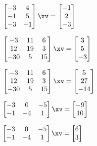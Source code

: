 \begin{exercise}
\begin{Parts}
\item \(\begin{bmatrix} -3&4
\\-1&5
\\-3&-1 \end{bmatrix}\xv
=\begin{bmatrix} -1\\2\\-3 \end{bmatrix}\)

\begin{OmitV1}
\item \(\begin{bmatrix} -3&11&6
\\12&19&3
\\-30&5&15 \end{bmatrix}\xv
=\begin{bmatrix} 3\\5\\-3 \end{bmatrix}\)

\item \(\begin{bmatrix} -3&11&6
\\12&19&3
\\-30&5&15 \end{bmatrix}\xv
=\begin{bmatrix} 5\\27\\-14 \end{bmatrix}\)

\item \(\begin{bmatrix} -3&0&-5
\\-1&-4&1 \end{bmatrix}\xv
=\begin{bmatrix} -9\\10 \end{bmatrix}\)

\item \(\begin{bmatrix} -3&0&-5
\\-1&-4&1 \end{bmatrix}\xv
=\begin{bmatrix} 6\\3 \end{bmatrix}\)


\end{OmitV1}
\end{Parts}
\end{exercise}
